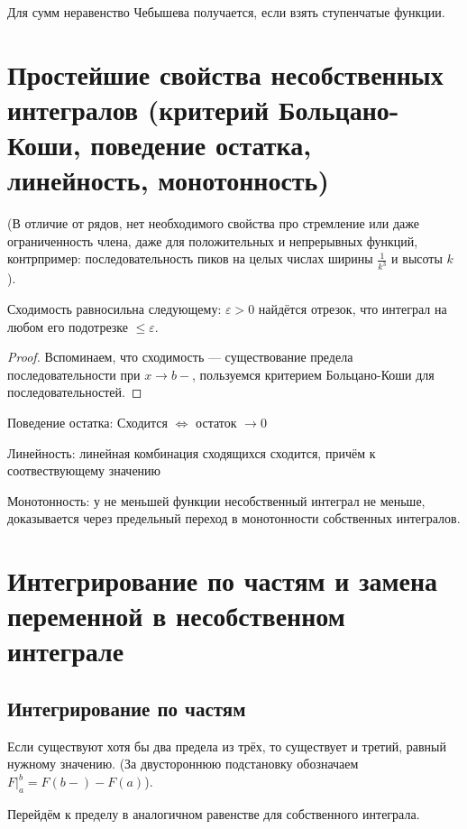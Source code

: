 \documentclass[12pt, a4paper]{article}
\begin{document}
    Для сумм неравенство Чебышева получается, если взять ступенчатые функции.

\section{Простейшие свойства несобственных интегралов (критерий Больцано-Коши, поведение остатка, линейность, монотонность)}

(В отличие от рядов, нет необходимого свойства 
про стремление или даже ограниченность члена, даже для положительных и непрерывных функций, 
контрпример: последовательность пиков на целых числах ширины $\frac{1}{k^3}$ и высоты $k$).

\begin{theorem}

    Сходимость равносильна следующему: 
    $\varepsilon > 0$ найдётся отрезок, что интеграл на любом его подотрезке $\leqslant \varepsilon$.

    \begin{proof}
        Вспоминаем, что сходимость — существование предела последовательности при $x → b-$,
        пользуемся критерием Больцано-Коши для последовательностей.
    \end{proof}
\end{theorem}

Поведение остатка: Сходится $\Leftrightarrow$ остаток $→ 0$

Линейность: линейная комбинация сходящихся сходится, причём к соотвествующему значению

Монотонность: у не меньшей функции несобственный интеграл не меньше, 
доказывается через предельный переход в монотонности собственных интегралов.

\section{Интегрирование по частям и замена переменной в несобственном интеграле}

    \subsection{Интегрирование по частям}
    Если существуют хотя бы два предела из трёх, то существует и третий, равный нужному значению.
    (За двустороннюю подстановку обозначаем $F|^b_a = F(b-) - F(a)$).

    Перейдём к пределу в аналогичном равенстве для собственного интеграла.
\end{document}
